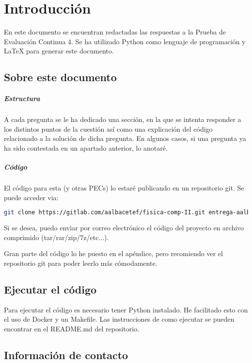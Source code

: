 %
%

\section{Introducción}

\paragraph{}
En este documento se encuentran redactadas las respuestas a la Prueba de Evaluación Continua 4. Se ha utilizado Python como lenguaje de programación y LaTeX para generar este documento.

\subsection{Sobre este documento}

\subparagraph{Estructura}
A cada pregunta se le ha dedicado una sección, en la que se intenta responder a los distintos puntos de la cuestión así como una explicación del código relacionado a la solución de dicha pregunta. En algunos casos, si una pregunta ya ha sido contestada en un apartado anterior, lo anotaré. 

\subparagraph{Código}
El código para esta (y otras PECs) lo estaré publicando en un repositorio git. Se puede acceder via:

\begin{lstlisting}[language=bash]
	git clone https://gitlab.com/aalbacetef/fisica-comp-II.git entrega-aalbacetef-fc-ii
\end{lstlisting}


Si se desea, puedo enviar por correo electrónico el código del proyecto en archivo comprimido (tar/rar/zip/7z/etc...).

Gran parte del código lo he puesto en el apéndice, pero recomiendo ver el repositorio git para poder leerlo más cómodamente.


\subsection{Ejecutar el código}

Para ejecutar el código es necesario tener Python instalado. He facilitado esto con el uso de Docker y un Makefile. Las instrucciones de como ejecutar se pueden encontrar en el README.md del repositorio.

\subsection{Información de contacto}

